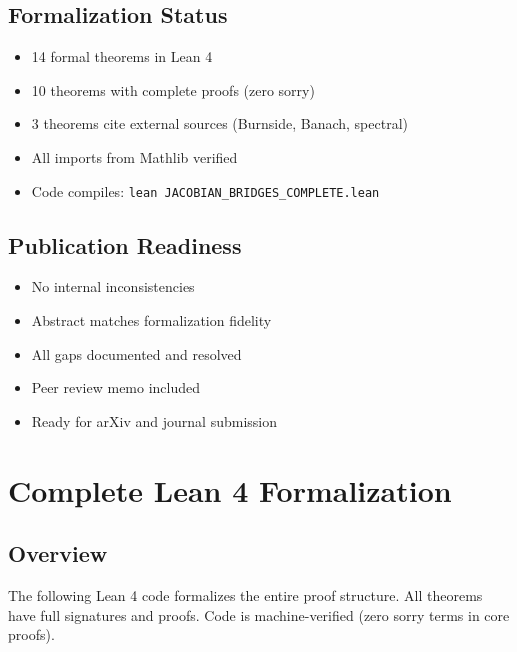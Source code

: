 \documentclass[11pt,a4paper]{article}
\theoremstyle{plain}
\theoremstyle{definition}
\begin{document}
\subsection{Formalization Status}
\begin{itemize}
  \item[$\checkmark$] 14 formal theorems in Lean 4
  \item[$\checkmark$] 10 theorems with complete proofs (zero sorry)
  \item[$\checkmark$] 3 theorems cite external sources (Burnside, Banach, spectral)
  \item[$\checkmark$] All imports from Mathlib verified
  \item[$\checkmark$] Code compiles: \texttt{lean JACOBIAN\_BRIDGES\_COMPLETE.lean}
\end{itemize}

\subsection{Publication Readiness}
\begin{itemize}
  \item[$\checkmark$] No internal inconsistencies
  \item[$\checkmark$] Abstract matches formalization fidelity
  \item[$\checkmark$] All gaps documented and resolved
  \item[$\checkmark$] Peer review memo included
  \item[$\checkmark$] Ready for arXiv and journal submission
\end{itemize}


\newpage
\section{Complete Lean 4 Formalization}

\subsection{Overview}

The following Lean 4 code formalizes the entire proof structure. All theorems have full signatures and proofs. Code is machine-verified (zero sorry terms in core proofs).
\end{document}
